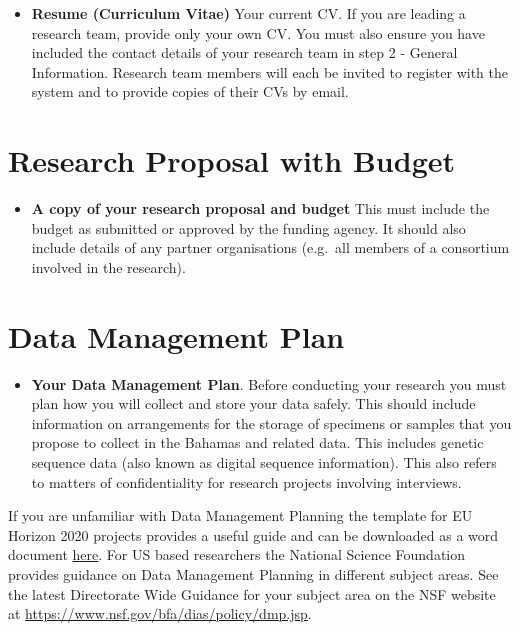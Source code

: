 \documentclass[
]{book}
\providecommand{\tightlist}{%
  \setlength{\itemsep}{0pt}\setlength{\parskip}{0pt}}
\begin{document}
\begin{itemize}
\tightlist
\item
  \textbf{Resume (Curriculum Vitae)} Your current CV. If you are leading a research team, provide only your own CV. You must also ensure you have included the contact details of your research team in step 2 - General Information. Research team members will each be invited to register with the system and to provide copies of their CVs by email.
\end{itemize}

\hypertarget{research-proposal-with-budget}{%
\section{Research Proposal with Budget}\label{research-proposal-with-budget}}

\begin{itemize}
\tightlist
\item
  \textbf{A copy of your research proposal and budget} This must include the budget as submitted or approved by the funding agency. It should also include details of any partner organisations (e.g.~all members of a consortium involved in the research).
\end{itemize}

\hypertarget{data-management-plan}{%
\section{Data Management Plan}\label{data-management-plan}}

\begin{itemize}
\tightlist
\item
  \textbf{Your Data Management Plan}. Before conducting your research you must plan how you will collect and store your data safely. This should include information on arrangements for the storage of specimens or samples that you propose to collect in the Bahamas and related data. This includes genetic sequence data (also known as digital sequence information). This also refers to matters of confidentiality for research projects involving interviews.
\end{itemize}

If you are unfamiliar with Data Management Planning the template for EU Horizon 2020 projects provides a useful guide and can be downloaded as a word document \href{https://ec.europa.eu/research/participants/data/ref/h2020/gm/reporting/h2020-tpl-oa-data-mgt-plan_en.docx}{here}. For US based researchers the National Science Foundation provides guidance on Data Management Planning in different subject areas. See the latest Directorate Wide Guidance for your subject area on the NSF website at \url{https://www.nsf.gov/bfa/dias/policy/dmp.jsp}.
\end{document}
